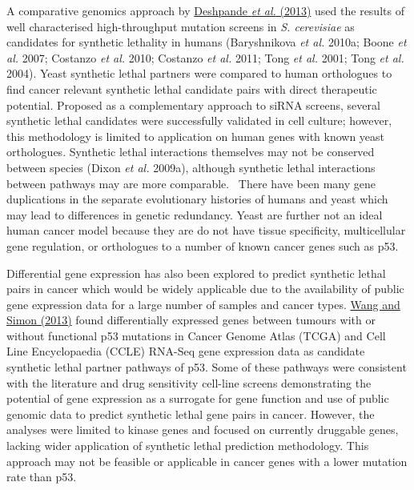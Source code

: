 A comparative genomics approach by
\hyperlink{ENREF30}{Deshpande}\hyperlink{ENREF30}{\textit{ et
al.}}\hyperlink{ENREF30}{ (2013)} used the results of well
characterised high-throughput mutation screens in \textit{S. cerevisiae
}as candidates for synthetic lethality in humans (Baryshnikova\textit{
et al.} 2010a; Boone\textit{ et al.} 2007; Costanzo\textit{ et al.}
2010; Costanzo\textit{ et al.} 2011; Tong\textit{ et al.} 2001;
Tong\textit{ et al.} 2004). Yeast synthetic lethal partners were
compared to human orthologues to find cancer relevant synthetic lethal
candidate pairs with direct therapeutic potential. Proposed as a
complementary approach to siRNA screens, several synthetic lethal
candidates were successfully validated in cell culture; however, this
methodology is limited to application on human genes with known yeast
orthologues. Synthetic lethal interactions themselves may not be
conserved between species (Dixon\textit{ et al.} 2009a), although
synthetic lethal interactions between pathways may are more comparable.
\ There have been many gene duplications in the separate evolutionary
histories of humans and yeast which may lead to differences in genetic
redundancy. Yeast are further not an ideal human cancer model because
they are do not have tissue specificity, multicellular gene regulation,
or orthologues to a number of known cancer genes such as p53. 


Differential gene expression has also been explored to predict synthetic
lethal pairs in cancer which would be widely applicable due to the
availability of public gene expression data for a large number of
samples and cancer types. \hyperlink{ENREF109}{Wang and Simon (2013)}
found differentially expressed genes between tumours with or without
functional p53 mutations in Cancer Genome Atlas (TCGA) and Cell Line
Encyclopaedia (CCLE) RNA-Seq gene expression data as candidate
synthetic lethal partner pathways of p53. Some of these pathways were
consistent with the literature and drug sensitivity cell-line screens
demonstrating the potential of gene expression as a surrogate for gene
function and use of public genomic data to predict synthetic lethal
gene pairs in cancer. However, the analyses were limited to kinase
genes and focused on currently druggable genes, lacking wider
application of synthetic lethal prediction methodology. This approach
may not be feasible or applicable in cancer genes with a lower mutation
rate than p53. 



